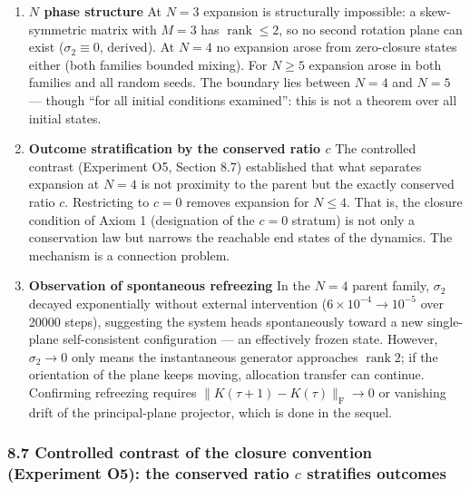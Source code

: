 \documentclass[
  a4paper,
]{article}
\providecommand{\tightlist}{%
  \setlength{\itemsep}{0pt}\setlength{\parskip}{0pt}}
\begin{document}
\begin{enumerate}
\def\labelenumi{\arabic{enumi}.}
\tightlist
\item
  \textbf{\(N\) phase structure} At \(N=3\) expansion is structurally
  impossible: a skew-symmetric matrix with \(M=3\) has
  \(\operatorname{rank}\le2\), so no second rotation plane can exist
  (\(\sigma_2\equiv0\), derived). At \(N=4\) no expansion arose from
  zero-closure states either (both families bounded mixing). For
  \(N\ge5\) expansion arose in both families and all random seeds. The
  boundary lies between \(N=4\) and \(N=5\) --- though ``for all initial
  conditions examined'': this is not a theorem over all initial states.
\item
  \textbf{Outcome stratification by the conserved ratio \(c\)} The
  controlled contrast (Experiment O5, Section 8.7) established that what
  separates expansion at \(N=4\) is not proximity to the parent but the
  exactly conserved ratio \(c\). Restricting to \(c=0\) removes
  expansion for \(N\le4\). That is, the closure condition of Axiom 1
  (designation of the \(c=0\) stratum) is not only a conservation law
  but narrows the reachable end states of the dynamics. The mechanism is
  a connection problem.
\item
  \textbf{Observation of spontaneous refreezing} In the \(N=4\) parent
  family, \(\sigma_2\) decayed exponentially without external
  intervention (\(6\times10^{-4}\to10^{-5}\) over 20000 steps),
  suggesting the system heads spontaneously toward a new single-plane
  self-consistent configuration --- an effectively frozen state.
  However, \(\sigma_2\to0\) only means the instantaneous generator
  approaches \(\operatorname{rank}2\); if the orientation of the plane
  keeps moving, allocation transfer can continue. Confirming refreezing
  requires \(\lVert K(\tau{+}1)-K(\tau)\rVert_{\mathrm F}\to0\) or
  vanishing drift of the principal-plane projector, which is done in the
  sequel.
\end{enumerate}

\subsubsection{\texorpdfstring{8.7 Controlled contrast of the closure
convention (Experiment O5): the conserved ratio \(c\) stratifies
outcomes}{8.7 Controlled contrast of the closure convention (Experiment O5): the conserved ratio c stratifies outcomes}}\label{controlled-contrast-of-the-closure-convention-experiment-o5-the-conserved-ratio-c-stratifies-outcomes}
\end{document}

